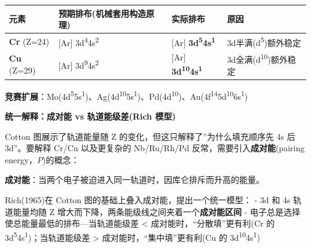 \documentclass[a4paper,11pt]{ctexart}
\newcounter{none}
\newcommand{\箭}{\ensuremath{\rightarrow}}
\newcommand{\左箭}{\ensuremath{\leftarrow}}
\newcommand{\上箭}{\ensuremath{\uparrow}}
\newcommand{\下箭}{\ensuremath{\downarrow}}
\newcommand{\衡}{\ensuremath{\rightleftharpoons}}
\newcommand{\双箭}{\ensuremath{\leftrightarrow}}
\newcommand{\约等于}{\ensuremath{\approx}}
\newcommand{\小于等于}{\ensuremath{\leq}}
\newcommand{\大于等于}{\ensuremath{\geq}}
\newcommand{\不等于}{\ensuremath{\neq}}
\newcommand{\西格马}{\ensuremath{\sigma}}
\newcommand{\派}{\ensuremath{\pi}}
\begin{document}
{\def\LTcaptype{none} %
\begin{longtable}[]{@{}
  >{\raggedright\arraybackslash}p{}
  >{\raggedright\arraybackslash}p{}
  >{\raggedright\arraybackslash}p{}
  >{\raggedright\arraybackslash}p{}@{}}
\toprule\noalign{}
\begin{minipage}[b]{\linewidth}\raggedright
元素
\end{minipage} & \begin{minipage}[b]{\linewidth}\raggedright
预期排布(机械套用构造原理)
\end{minipage} & \begin{minipage}[b]{\linewidth}\raggedright
实际排布
\end{minipage} & \begin{minipage}[b]{\linewidth}\raggedright
原因
\end{minipage} \\
\midrule\noalign{}
\endhead
\bottomrule\noalign{}
\endlastfoot
\textbf{Cr} (Z=24) & {[}Ar{]} 3d\textsuperscript{4}4s\textsuperscript{2} & {[}Ar{]} \textbf{3d\textsuperscript{5}4s\textsuperscript{1}} & 3d半满(d\textsuperscript{5})额外稳定 \\
\textbf{Cu} (Z=29) & {[}Ar{]} 3d\textsuperscript{9}4s\textsuperscript{2} & {[}Ar{]} \textbf{3d\textsuperscript{10}4s\textsuperscript{1}} & 3d全满(d\textsuperscript{10})额外稳定 \\
\end{longtable}
}

\textbf{竞赛扩展}：Mo(4d\textsuperscript{5}5s\textsuperscript{1})、Ag(4d\textsuperscript{10}5s\textsuperscript{1})、Pd(4d\textsuperscript{10})、Au(4f\textsuperscript{14}5d\textsuperscript{10}6s\textsuperscript{1})

\textbf{统一解释：成对能 vs 轨道能级差(Rich 模型)}

Cotton 图展示了轨道能量随 Z 的变化，但这只解释了''为什么填充顺序先 4s 后 3d''。要解释 Cr/Cu 以及更复杂的 Nb/Ru/Rh/Pd 反常，需要引入\textbf{成对能}(pairing energy，\(P\))的概念：

\textbf{成对能}：当两个电子被迫进入同一轨道时，因库仑排斥而升高的能量。

Rich(1965)在 Cotton 图的基础上叠入成对能，提出一个统一模型：
- 3d 和 4s 轨道能量均随 Z 增大而下降，两条能级线之间夹着一个\textbf{成对能区间}
- 电子总是选择使总能量最低的排布---当轨道能级差 \textless{} 成对能时，``分散填''更有利(Cr 的 3d\textsuperscript{5}4s\textsuperscript{1})；当轨道能级差 \textgreater{} 成对能时，``集中填''更有利(Cu 的 3d\textsuperscript{10}4s\textsuperscript{1})
\end{document}
